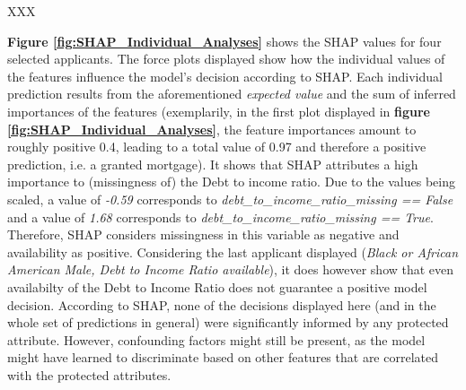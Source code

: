 XXX


\textbf{Figure \ref{fig:SHAP_Individual_Analyses}} shows the SHAP values for four selected applicants. The force plots displayed show how the individual values of the features influence the model's decision according to SHAP. 
Each individual prediction results from the aforementioned \textit{expected value} and the sum of inferred importances of the features (exemplarily, in the first plot displayed in \textbf{figure \ref{fig:SHAP_Individual_Analyses}}, the feature importances amount to roughly positive 0.4, leading to a total value of 0.97 and therefore a positive prediction, i.e. a granted mortgage).
It shows that SHAP attributes a high importance to (missingness of) the Debt to income ratio. Due to the values being scaled, a value of \textit{-0.59} corresponds to \textit{debt\_to\_income\_ratio\_missing == False} and a value of \textit{1.68} corresponds to \textit{debt\_to\_income\_ratio\_missing == True}. Therefore, SHAP considers missingness in this variable as negative and availability as positive.
Considering the last applicant displayed (\textit{Black or African American Male, Debt to Income Ratio available}), it does however show that even availabilty of the Debt to Income Ratio does not guarantee a positive model decision.
According to SHAP, none of the decisions displayed here (and in the whole set of predictions in general) were significantly informed by any protected attribute. However, confounding factors might still be present, as the model might have learned to discriminate based on other features that are correlated with the protected attributes.

